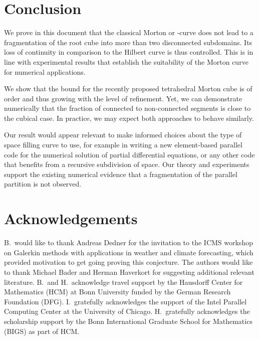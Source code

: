 \documentclass[a4paper,11pt]{article}
\newcommand{\seclab}[1]{\label{sec:#1}}
\begin{document}
\section{Conclusion}
\seclab{conclusion}

We prove in this document that the classical Morton or -curve does not lead
to a fragmentation of the root cube into more than two disconnected subdomains.
Its loss of continuity in comparison to the Hilbert curve is thus controlled.
This is in line with experimental results
that establish the suitability of the Morton curve for
numerical applications.

We show that the bound for the recently proposed tetrahedral Morton cube is of
order  and thus growing with the level of refinement.
Yet, we can demonstrate numerically that the fraction of connected to
non-connected segments is close to the cubical case.
In practice, we may expect both approaches to behave similarly.

Our result would appear relevant to make informed choices about the
type of space filling curve to use, for example in writing a new element-based
parallel code for the numerical solution of partial differential equations, or
any other code that benefits from a recursive subdivision of space.
Our theory and experiments support the existing numerical evidence that a
fragmentation of the parallel partition is not observed.



\section*{Acknowledgements}
\seclab{ack}

B.\  would like to thank Andreas Dedner for the invitation to the ICMS workshop on
Galerkin methods with applications in weather and climate forecasting, which 
provided motivation to get going proving this conjecture.
The authors would like to thank Michael Bader and Herman Haverkort for
suggesting additional relevant literature.
B.\ and H.\ acknowledge travel support by the Hausdorff Center for Mathematics
(HCM) at Bonn University
funded by the German Research Foundation (DFG).
I.\ gratefully acknowledges the support of the Intel Parallel Computing Center
at the University of Chicago.
H.\ gratefully acknowledges the scholarship support by the Bonn International
Graduate School for Mathematics (BIGS) as part of HCM.



\end{document}
